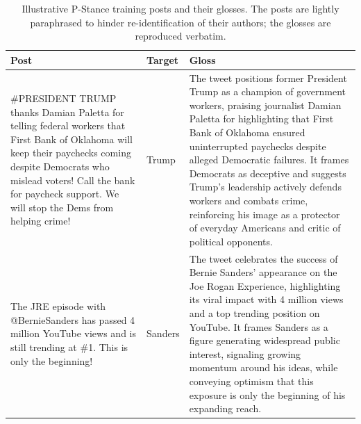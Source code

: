 \documentclass[pdflatex,sn-mathphys-num,iicol]{sn-jnl}%
\begin{document}
\begin{table}[p]
	\caption{Illustrative P-Stance training posts and their glosses. The posts are lightly paraphrased to hinder re-identification of their authors; the glosses are reproduced verbatim.}
	\label{tab:examples_pstance}
	\centering
	\tablebodyfont{}
	\setlength{\tabcolsep}{5pt}
	\renewcommand{\arraystretch}{1.12}
	\begin{tabular}{@{}L{0.295\textwidth}L{0.085\textwidth}L{0.545\textwidth}@{}}
		\toprule
		\textbf{Post} & \textbf{Target} & \textbf{Gloss} \\
		\midrule
		\#PRESIDENT TRUMP thanks Damian Paletta for telling federal workers that First Bank of Oklahoma will keep their paychecks coming despite Democrats who mislead voters! Call the bank for paycheck support. We will stop the Dems from helping crime! & Trump & The tweet positions former President Trump as a champion of government workers, praising journalist Damian Paletta for highlighting that First Bank of Oklahoma ensured uninterrupted paychecks despite alleged Democratic failures. It frames Democrats as deceptive and suggests Trump's leadership actively defends workers and combats crime, reinforcing his image as a protector of everyday Americans and critic of political opponents. \\
		\addlinespace[3pt]
		The JRE episode with @BernieSanders has passed 4 million YouTube views and is still trending at \#1. This is only the beginning! & Sanders & The tweet celebrates the success of Bernie Sanders' appearance on the Joe Rogan Experience, highlighting its viral impact with 4 million views and a top trending position on YouTube. It frames Sanders as a figure generating widespread public interest, signaling growing momentum around his ideas, while conveying optimism that this exposure is only the beginning of his expanding reach. \\
		\bottomrule
	\end{tabular}
\end{table}
\end{document}
